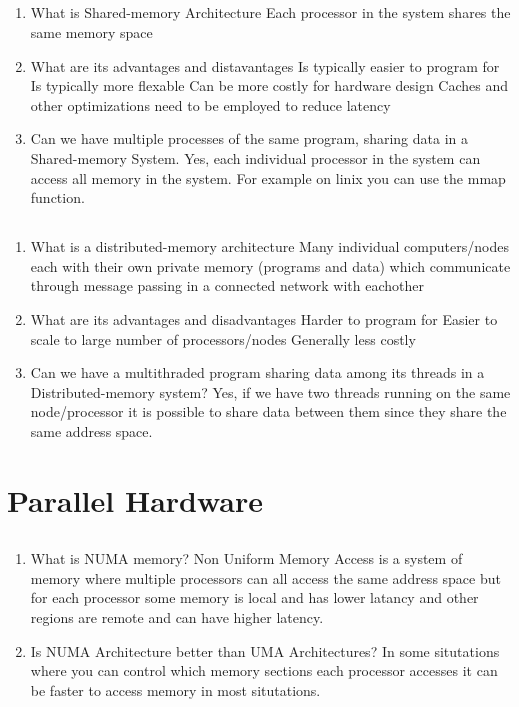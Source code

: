 \documentclass[12pt]{article}
\begin{document}
\subsection{}
\begin{enumerate}
	\item What is Shared-memory Architecture
	\subitem Each processor in the system shares the same memory space 
	\item What are its advantages and distavantages
	\subitem Is typically easier to program for 
	\subitem Is typically more flexable 
	\subitem Can be more costly for hardware design
	\subitem Caches and other optimizations need to be employed to reduce latency 
	\item Can we have multiple processes of the same program, sharing data in a Shared-memory System.
	\subitem Yes, each individual processor in the system can access all memory in the system. For example on linix you can use the mmap function.
\end{enumerate}

\subsection{}
\begin{enumerate}
	\item What is a distributed-memory architecture
	\subitem Many individual computers/nodes each with their own private memory (programs and data) which communicate through message passing in a connected network with eachother
	\item What are its advantages and disadvantages
	\subitem Harder to program for
	\subitem Easier to scale to large number of processors/nodes 
	\subitem Generally less costly
	\item Can we have a multithraded program sharing data among its threads in a Distributed-memory system?
	\subitem Yes, if we have two threads running on the same node/processor it is possible to share data between them since they share the same address space.
\end{enumerate}

\section{Parallel Hardware}

\subsection{}
\begin{enumerate}
	\item What is NUMA memory?
	\subitem Non Uniform Memory Access is a system of memory where multiple processors can all access the same address space but for each processor some memory is local and has lower latancy and other regions are remote and can have higher latency.
	\item Is NUMA Architecture better than UMA Architectures?
	\subitem In some situtations where you can control which memory sections each processor accesses it can be faster to access memory in most situtations. 
\end{enumerate}
\end{document}

